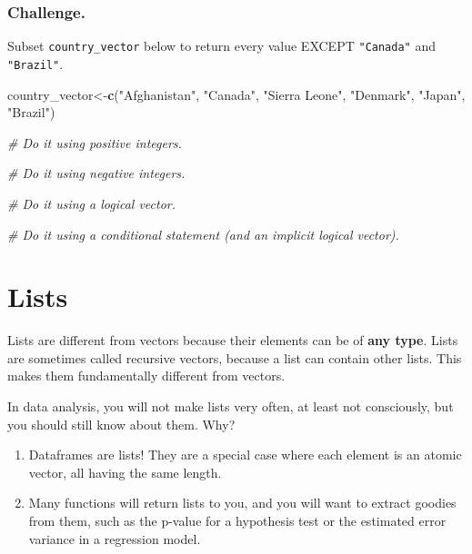 \documentclass[]{book}
\newenvironment{Shaded}{\begin{snugshade}}{\end{snugshade}}
\newcommand{\KeywordTok}[1]{\textcolor[rgb]{0.13,0.29,0.53}{\textbf{#1}}}
\newcommand{\StringTok}[1]{\textcolor[rgb]{0.31,0.60,0.02}{#1}}
\newcommand{\CommentTok}[1]{\textcolor[rgb]{0.56,0.35,0.01}{\textit{#1}}}
\newcommand{\NormalTok}[1]{#1}
\providecommand{\tightlist}{%
  \setlength{\itemsep}{0pt}\setlength{\parskip}{0pt}}
\begin{document}
\subsubsection*{Challenge.}\label{challenge.}

Subset \texttt{country\_vector} below to return every value EXCEPT
\texttt{"Canada"} and \texttt{"Brazil"}.

\begin{Shaded}
\begin{Highlighting}[]
\NormalTok{country_vector<-}\KeywordTok{c}\NormalTok{(}\StringTok{"Afghanistan"}\NormalTok{, }\StringTok{"Canada"}\NormalTok{, }\StringTok{"Sierra Leone"}\NormalTok{, }\StringTok{"Denmark"}\NormalTok{, }\StringTok{"Japan"}\NormalTok{, }\StringTok{"Brazil"}\NormalTok{)}

\CommentTok{# Do it using positive integers.}

\CommentTok{# Do it using negative integers.}

\CommentTok{# Do it using a logical vector.}

\CommentTok{# Do it using a conditional statement (and an implicit logical vector).}
\end{Highlighting}
\end{Shaded}

\hypertarget{lists}{\section{Lists}\label{lists}}

Lists are different from vectors because their elements can be of
\textbf{any type}. Lists are sometimes called recursive vectors, because
a list can contain other lists. This makes them fundamentally different
from vectors.

In data analysis, you will not make lists very often, at least not
consciously, but you should still know about them. Why?

\begin{enumerate}
\def\labelenumi{\arabic{enumi}.}
\tightlist
\item
  Dataframes are lists! They are a special case where each element is an
  atomic vector, all having the same length.
\item
  Many functions will return lists to you, and you will want to extract
  goodies from them, such as the p-value for a hypothesis test or the
  estimated error variance in a regression model.
\end{enumerate}
\end{document}
